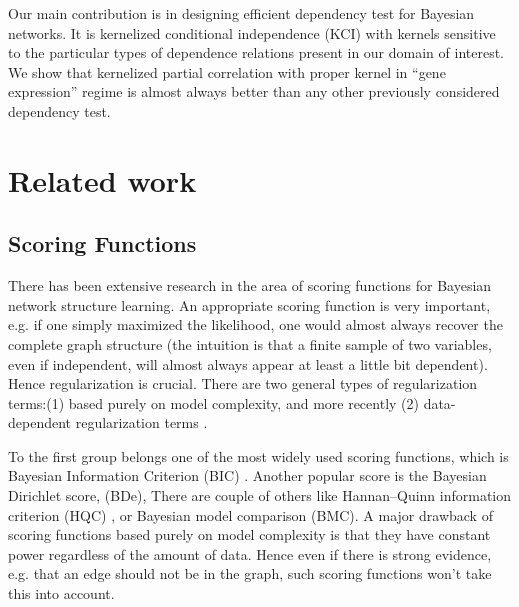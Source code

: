 \documentclass{article} %
\begin{document}
Our main contribution is in designing efficient dependency test for Bayesian networks. It is kernelized conditional independence (KCI) with kernels sensitive to the particular types of dependence relations present in our domain of interest. We show that kernelized partial correlation with proper kernel in ``gene expression'' regime is almost always better than any other previously considered dependency test. 


\section{Related work}

\subsection{Scoring Functions}
There has been extensive research in the area of scoring functions for Bayesian network structure learning. An appropriate scoring function is very important, e.g. if one simply maximized the likelihood, one would almost always recover the complete graph structure (the intuition is that a finite sample of two variables, even if independent, will almost always appear at least a little bit dependent).  Hence regularization is crucial.  There are two general types of regularization terms:(1) based purely on model complexity, and more recently (2) data-dependent regularization terms \cite{brenner2013sparsityboost}.

To the first group belongs one of the most widely used scoring functions, which is Bayesian Information Criterion (BIC) \cite{schwarz1978estimating}.  Another popular score is the Bayesian Dirichlet score, (BDe), There are couple of others like Hannan–Quinn information criterion (HQC) \cite{hannan1979determination},
or Bayesian model comparison (BMC). A major drawback of scoring functions based purely on model complexity is that they have constant power regardless of the amount of data.  Hence even if there is strong evidence, e.g. that an edge should not be in the graph, such scoring functions won't take this into account.
\end{document}
